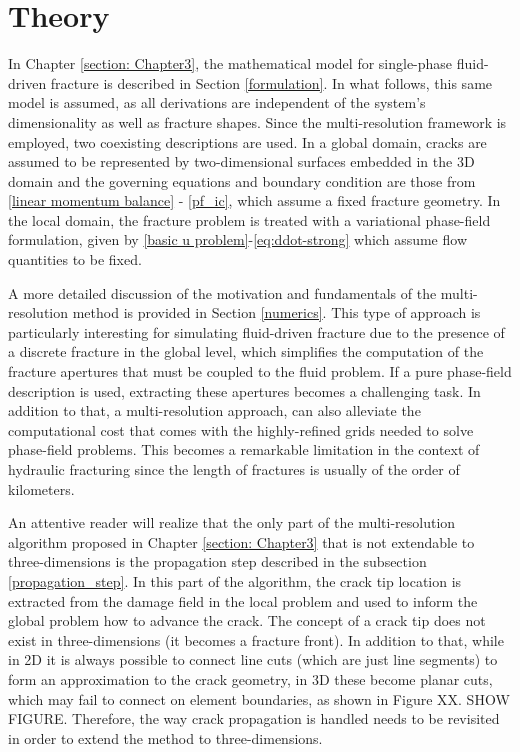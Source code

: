 \section{Theory}
\label{section: Chapter4/theory}

In Chapter \ref{section: Chapter3}, the mathematical model for single-phase fluid-driven fracture is described in Section \ref{formulation}. In what follows, this same model is assumed, as all derivations are independent of the system's dimensionality as well as fracture shapes. Since the multi-resolution framework is employed, two coexisting descriptions are used. In a global domain, cracks are assumed to be represented by two-dimensional surfaces embedded in the 3D domain and the governing equations and boundary condition are those from \eqref{linear momentum balance} - \eqref{pf_ic}, which assume a fixed fracture geometry. In the local domain, the fracture problem is treated with a variational phase-field formulation, given by \eqref{basic u problem}-\eqref{eq:ddot-strong} which assume flow quantities to be fixed.

A more detailed discussion of the motivation and fundamentals of the multi-resolution method is provided in Section \ref{numerics}. This type of approach is particularly interesting for simulating fluid-driven fracture due to the presence of a discrete fracture in the global level, which simplifies the computation of the fracture apertures that must be coupled to the fluid problem. If a pure phase-field description is used, extracting these apertures becomes a challenging task. In addition to that, a multi-resolution approach, can also alleviate the computational cost that comes with the highly-refined grids needed to solve phase-field problems. This becomes a remarkable limitation in the context of hydraulic fracturing since the length of fractures is usually of the order of kilometers.


An attentive reader will realize that the only part of the multi-resolution algorithm proposed in Chapter \ref{section: Chapter3} that is not extendable to three-dimensions is the propagation step described in the subsection \ref{propagation_step}. In this part of the algorithm, the crack tip location is extracted from the damage field in the local problem and used to inform the global problem how to advance the crack. The concept of a crack tip does not exist in three-dimensions (it becomes a fracture front). In addition to that, while in 2D it is always possible to connect line cuts (which are just line segments) to form an approximation to the crack geometry, in 3D these become planar cuts, which may fail to connect on element boundaries, as shown in Figure XX. SHOW FIGURE. Therefore, the way crack propagation is handled needs to be revisited in order to extend the method to three-dimensions.

